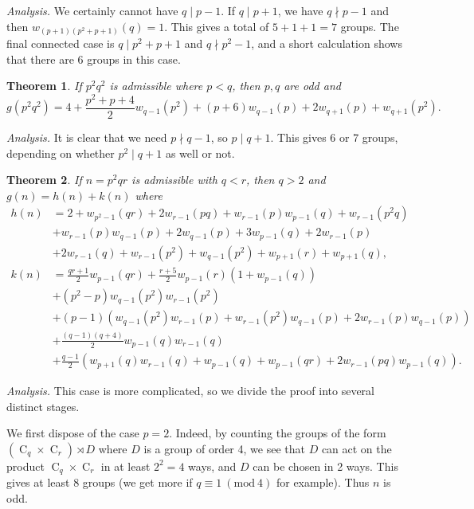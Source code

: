 \documentclass{article}
\newcommand{\cyc}[1]{\operatorname{C}_{#1}}
\newcommand{\Mod}[1]{\ (\mathrm{mod} \ #1)}
\theoremstyle{plain}
\newtheorem{fact}{Theorem}[section]
\theoremstyle{definition}
\begin{document}
\textit{Analysis.} We certainly cannot have $q \mid p - 1$. If $q \mid p + 1$, we have $q \nmid p - 1$ and then $w_{(p + 1)(p^2 + p + 1)}(q) = 1$. This gives a total of $5 + 1 + 1 = 7$ groups. The final connected case is $q \mid p^2 + p + 1$ and $q \nmid p^2 - 1$, and a short calculation shows that there are 6 groups in this  case.

\begin{fact}
	If $p^2 q^2$ is admissible where $p < q$, then $p, q$ are odd and
	\[g(p^2 q^2) = 4 + \frac{p^2 + p + 4}{2} w_{q - 1}(p^2) + (p + 6)w_{q - 1}(p) + 2w_{q + 1}(p) + w_{q + 1}(p^2).\]
\end{fact}

\textit{Analysis.} It is clear that we need $p \nmid q - 1$, so $p \mid q + 1$. This gives 6 or 7 groups, depending on whether $p^2 \mid q + 1$ as well or not.

\begin{fact} 
	If $n = p^2 q r$ is admissible with $q < r$, then $q > 2$ and $g(n) = h(n) + k(n)$ where$$\begin{aligned}
		h(n) &= 2 + w_{p^2 - 1}(qr) + 2w_{r - 1}(pq) + w_{r - 1}(p)w_{p - 1}(q) + w_{r - 1}(p^2 q) \\ 
		&+ w_{r - 1}(p)w_{q - 1}(p) + 2w_{q - 1}(p) + 3w_{p - 1}(q) + 2w_{r - 1}(p) \\ 
		&+ 2w_{r - 1}(q) + w_{r - 1}(p^2) + w_{q - 1}(p^2) + w_{p + 1}(r) + w_{p + 1}(q), \\
		k(n) &= \frac{qr + 1}{2} w_{p - 1}(qr) + \frac{r + 5}{2} w_{p - 1}(r)(1 + w_{p - 1}(q))\\
		&+ (p^2 - p)w_{q - 1}(p^2)w_{r - 1}(p^2) \\
		&+ (p - 1)(w_{q - 1}(p^2)w_{r - 1}(p) + w_{r - 1}(p^2)w_{q - 1}(p) + 2w_{r - 1}(p)w_{q - 1}(p)) \\
		&+ \frac{(q - 1)(q + 4)}{2} w_{p - 1}(q)w_{r - 1}(q) \\
		&+ \frac{q - 1}{2} (w_{p + 1}(q)w_{r - 1}(q) + w_{p - 1}(q) + w_{p - 1}(qr) + 2w_{r - 1}(pq)w_{p - 1}(q)).
	\end{aligned}$$
\end{fact}

\textit{Analysis.} This case is more complicated, so we divide the proof into several distinct stages.

We first dispose of the case $p = 2$. Indeed, by counting the groups of the form $(\cyc{q} \times \cyc{r}) \rtimes D$ where $D$ is a group of order 4, we see that $D$ can act on the product $\cyc{q} \times \cyc{r}$ in at least $2^2 = 4$ ways, and $D$ can be chosen in 2 ways. This gives at least 8 groups (we get more if $q \equiv 1 \Mod{4}$ for example). Thus $n$ is odd.
\end{document}
